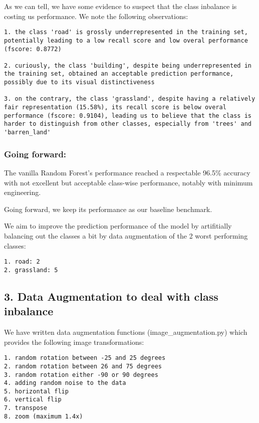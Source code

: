 \documentclass[11pt]{article}
\begin{document}
    As we can tell, we have some evidence to suspect that the class
inbalance is costing us performance. We note the following observations:

\begin{verbatim}
1. the class 'road' is grossly underrepresented in the training set, potentially leading to a low recall score and low overal performance (fscore: 0.8772)

2. curiously, the class 'building', despite being underrepresented in the training set, obtained an acceptable prediction performance, possibly due to its visual distinctiveness

3. on the contrary, the class 'grassland', despite having a relatively fair representation (15.58%), its recall score is below overal performance (fscore: 0.9104), leading us to believe that the class is harder to distinguish from other classes, especially from 'trees' and 'barren_land'
\end{verbatim}

    \subsubsection{Going forward:}\label{going-forward}

The vanilla Random Forest's performance reached a respectable 96.5\%
accuracy with not excellent but acceptable class-wise performance,
notably with minimum engineering.

Going forward, we keep its performance as our baseline benchmark.

We aim to improve the prediction performance of the model by
artifitially balancing out the classes a bit by data augmentation of the
2 worst performing classes:

\begin{verbatim}
1. road: 2
2. grassland: 5
\end{verbatim}

    \subsection{3. Data Augmentation to deal with class
inbalance}\label{data-augmentation-to-deal-with-class-inbalance}

    We have written data augmentation functions (image\_augmentation.py)
which provides the following image transformations:

\begin{verbatim}
1. random rotation between -25 and 25 degrees
2. random rotation between 26 and 75 degrees
3. random rotation either -90 or 90 degrees
4. adding random noise to the data
5. horizontal flip
6. vertical flip
7. transpose
8. zoom (maximum 1.4x)
\end{verbatim}
\end{document}
